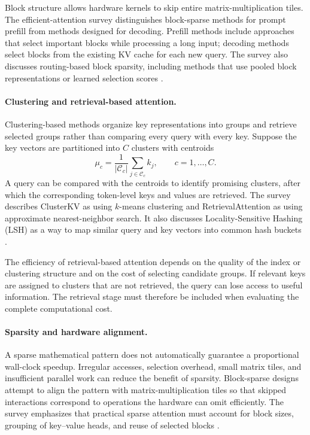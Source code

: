 Block structure allows hardware kernels to skip entire
matrix-multiplication tiles. The efficient-attention survey distinguishes
block-sparse methods for prompt prefill from methods designed for decoding. Prefill methods include approaches
that select important blocks while processing a long input; decoding
methods select blocks from the existing KV cache for each new query.
The survey also discusses routing-based block sparsity, including
methods that use pooled block representations or learned selection
scores \parencite{sun2026efficientattention}.

\paragraph{Clustering and retrieval-based attention.}
Clustering-based methods organize key representations into groups and
retrieve selected groups rather than comparing every query with every
key. Suppose the key vectors are partitioned into \(C\) clusters with
centroids
\begin{equation}
    \mu_c
    =
    \frac{1}{|\mathcal{C}_c|}
    \sum_{j\in\mathcal{C}_c}k_j,
    \qquad c=1,\ldots,C.
    \label{eq:attn-cluster-centroid}
\end{equation}
A query can be compared with the centroids to identify promising
clusters, after which the corresponding token-level keys and values
are retrieved. The survey describes ClusterKV as using \(k\)-means
clustering and RetrievalAttention as using approximate nearest-neighbor
search. It also discusses Locality-Sensitive Hashing (LSH) as a way
to map similar query and key vectors into common hash buckets
\parencite{sun2026efficientattention}.

The efficiency of retrieval-based attention depends on the quality of
the index or clustering structure and on the cost of selecting candidate
groups. If relevant keys are assigned to clusters that are not retrieved,
the query can lose access to useful information. The retrieval stage
must therefore be included when evaluating the complete computational
cost.

\paragraph{Sparsity and hardware alignment.}
A sparse mathematical pattern does not automatically guarantee a
proportional wall-clock speedup. Irregular accesses, selection overhead,
small matrix tiles, and insufficient parallel work can reduce the benefit
of sparsity. Block-sparse designs attempt to align the pattern with
matrix-multiplication tiles so that skipped interactions correspond to
operations the hardware can omit efficiently. The survey emphasizes
that practical sparse attention must account for block sizes, grouping
of key--value heads, and reuse of selected blocks
\parencite{sun2026efficientattention}.

